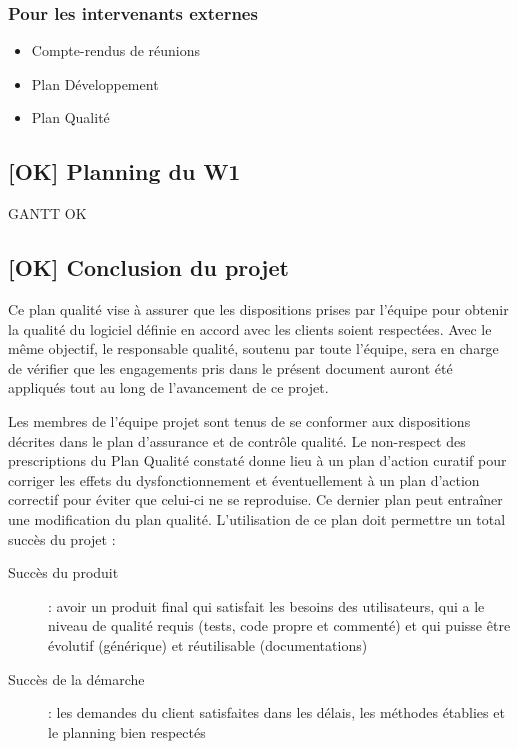 \documentclass[10pt,a4paper]{article}
\begin{document}
\subsubsection{Pour les intervenants externes}
\begin{itemize}
\item Compte-rendus de réunions 
\item Plan Développement 
\item Plan Qualité
\end{itemize}

\subsection{[OK] Planning du W1}

GANTT OK %

\subsection{[OK] Conclusion du projet}

Ce plan qualité vise à assurer que les dispositions prises par l’équipe pour obtenir la qualité du logiciel définie en accord avec les clients soient respectées. Avec le même objectif, le responsable qualité, soutenu par toute l’équipe, sera en charge de vérifier que les engagements pris dans le présent document auront été appliqués tout au long de l'avancement de ce projet.

Les membres de l'équipe projet sont tenus de se conformer aux dispositions décrites dans le plan d'assurance et de contrôle qualité. Le non-respect des prescriptions du Plan Qualité constaté donne lieu à un plan d'action curatif pour corriger les effets du dysfonctionnement et éventuellement à un plan d'action correctif pour éviter que celui-ci ne se reproduise. Ce dernier plan peut entraîner une modification du plan qualité. L’utilisation de ce plan doit permettre un total succès du projet :

\begin{description}
\item [Succès du produit] : avoir un produit final qui satisfait les besoins des utilisateurs, qui a le niveau de qualité requis (tests, code propre et commenté) et qui puisse être évolutif (générique) et réutilisable (documentations)
\item [Succès de la démarche] : les demandes du client satisfaites dans les délais, les méthodes établies et le planning bien respectés
\end{description}
\end{document}

